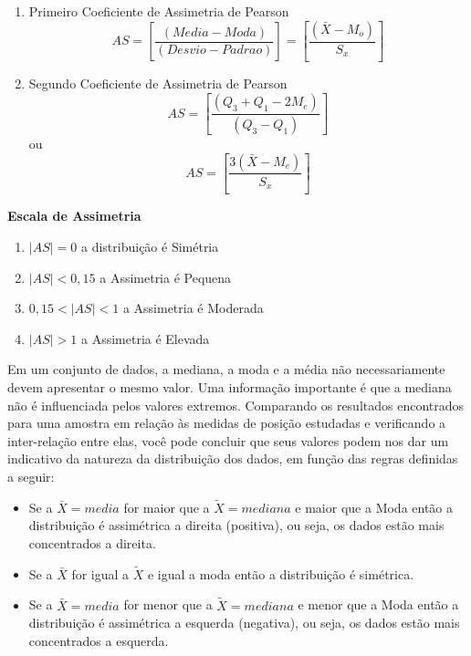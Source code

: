 \begin{enumerate}
  \item [{1)}]Primeiro Coeficiente de Assimetria de Pearson
  \begin{equation}\label{assimetria}
    AS = \left[ \frac{(Media-Moda)}{(Desvio-Padrao)} \right] = \left[  \frac{(\bar{X}-M_{o})}{S_{x}} \right]
\end{equation}
  \item [{2)}]Segundo Coeficiente de Assimetria de Pearson
  \begin{equation}\label{assimetria}
    AS = \left[ \frac{(Q_{3}+Q_{1}-2M_{e})}{(Q_{3}-Q_{1})} \right]
\end{equation}
    ou
 \begin{equation}
    AS = \left[ \frac{3(\bar{X}-M_{e})}{S_{x}} \right]
\end{equation}
\end{enumerate}






\textbf{Escala de Assimetria}

\begin{enumerate}
\item $|AS| =0$ a distribuição é Simétria
\item $|AS| < 0,15$ a Assimetria é Pequena
\item $0,15 < |AS| <1$ a Assimetria é Moderada
\item $|AS| > 1$ a Assimetria é Elevada
\end{enumerate}


\newpage 

Em um conjunto de dados, a mediana, a moda e a média
não necessariamente devem apresentar o mesmo valor. Uma
informação importante é que a mediana não é influenciada pelos valores extremos. Comparando os resultados encontrados para uma amostra em relação às medidas de posição estudadas e verificando a inter-relação entre elas, você pode concluir que seus valores podem nos dar um indicativo da natureza da distribuição dos dados, em função das regras definidas a seguir:


\begin{itemize}
\item Se a $\bar{X}=media$ for maior que a $\tilde{X}=mediana$ e maior que a Moda então a distribuição é assimétrica a direita (positiva), ou seja, os dados estão mais concentrados a direita.  	
\item Se a $\bar{X}$ for igual a $\tilde{X}$ e igual a moda então a distribuição é simétrica.
\item Se a $\bar{X}= media$ for menor que a $\tilde{X}= mediana$ e menor que a Moda então a distribuição é assimétrica a esquerda (negativa), ou seja, os dados estão mais concentrados a esquerda. 	
\end{itemize}


